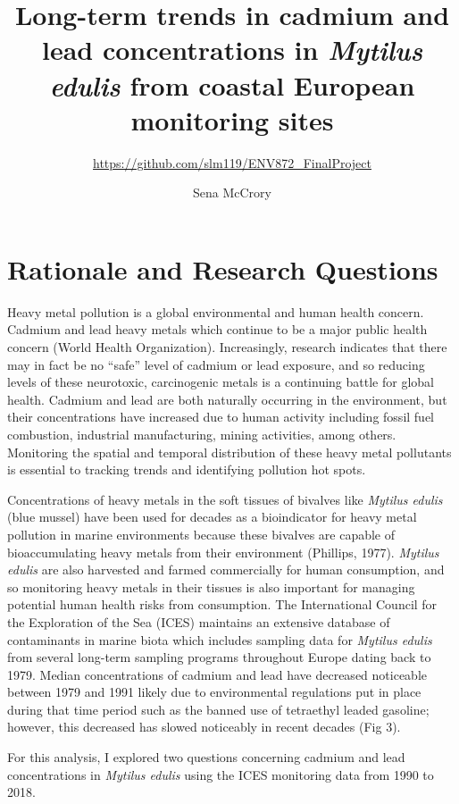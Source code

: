 \documentclass[
  12pt,
]{article}
\title{Long-term trends in cadmium and lead concentrations in \emph{Mytilus
edulis} from coastal European monitoring sites}
\subtitle{\url{https://github.com/slm119/ENV872_FinalProject}}
\author{Sena McCrory}
\date{}
\begin{document}
\maketitle

\newpage
\tableofcontents 
\newpage
\listoftables 
\newpage
\listoffigures 
\newpage

\hypertarget{rationale-and-research-questions}{%
\section{Rationale and Research
Questions}\label{rationale-and-research-questions}}

Heavy metal pollution is a global environmental and human health
concern. Cadmium and lead heavy metals which continue to be a major
public health concern (World Health Organization). Increasingly,
research indicates that there may in fact be no ``safe'' level of
cadmium or lead exposure, and so reducing levels of these neurotoxic,
carcinogenic metals is a continuing battle for global health. Cadmium
and lead are both naturally occurring in the environment, but their
concentrations have increased due to human activity including fossil
fuel combustion, industrial manufacturing, mining activities, among
others. Monitoring the spatial and temporal distribution of these heavy
metal pollutants is essential to tracking trends and identifying
pollution hot spots.

Concentrations of heavy metals in the soft tissues of bivalves like
\emph{Mytilus edulis} (blue mussel) have been used for decades as a
bioindicator for heavy metal pollution in marine environments because
these bivalves are capable of bioaccumulating heavy metals from their
environment (Phillips, 1977). \emph{Mytilus edulis} are also harvested
and farmed commercially for human consumption, and so monitoring heavy
metals in their tissues is also important for managing potential human
health risks from consumption. The International Council for the
Exploration of the Sea (ICES) maintains an extensive database of
contaminants in marine biota which includes sampling data for
\emph{Mytilus edulis} from several long-term sampling programs
throughout Europe dating back to 1979. Median concentrations of cadmium
and lead have decreased noticeable between 1979 and 1991 likely due to
environmental regulations put in place during that time period such as
the banned use of tetraethyl leaded gasoline; however, this decreased
has slowed noticeably in recent decades (Fig 3).

For this analysis, I explored two questions concerning cadmium and lead
concentrations in \emph{Mytilus edulis} using the ICES monitoring data
from 1990 to 2018.
\end{document}
